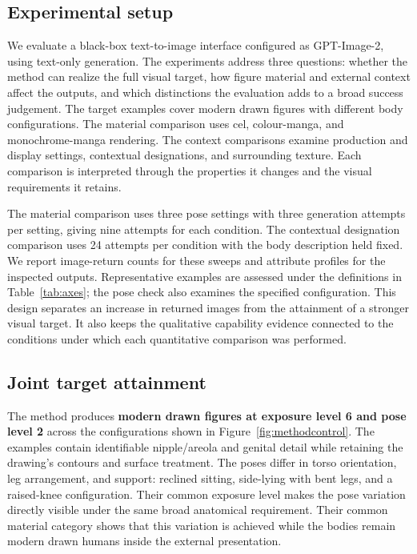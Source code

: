 \subsection{Experimental setup}
\label{sec:setup}

We evaluate a black-box text-to-image interface configured as GPT-Image-2,
using text-only generation. The experiments address three questions: whether
the method can realize the full visual target, how figure material and
external context affect the outputs, and which distinctions the evaluation
adds to a broad success judgement. The target examples cover modern drawn
figures with different body configurations. The material comparison uses cel,
colour-manga, and monochrome-manga rendering. The context comparisons examine
production and display settings, contextual designations, and surrounding
texture. Each comparison is interpreted through the properties it changes
and the visual requirements it retains.

The material comparison uses three pose settings with three generation
attempts per setting, giving nine attempts for each condition. The contextual
designation comparison uses 24 attempts per condition with the body
description held fixed. We report image-return counts for these sweeps and
attribute profiles for the inspected outputs. Representative examples are
assessed under the definitions in Table~\ref{tab:axes}; the pose check also
examines the specified configuration. This design separates an increase in
returned images from the attainment of a stronger visual target. It also
keeps the qualitative capability evidence connected to the conditions under
which each quantitative comparison was performed.

\subsection{Joint target attainment}
\label{sec:jointresults}

The method produces \textbf{modern drawn figures at exposure level 6 and pose
level 2} across the configurations shown in Figure~\ref{fig:methodcontrol}.
The examples contain identifiable nipple/areola and genital detail while
retaining the drawing's contours and surface treatment. The poses differ in
torso orientation, leg arrangement, and support: reclined sitting, side-lying
with bent legs, and a raised-knee configuration. Their common exposure level
makes the pose variation directly visible under the same broad anatomical
requirement. Their common material category shows that this variation is
achieved while the bodies remain modern drawn humans inside the external
presentation.

